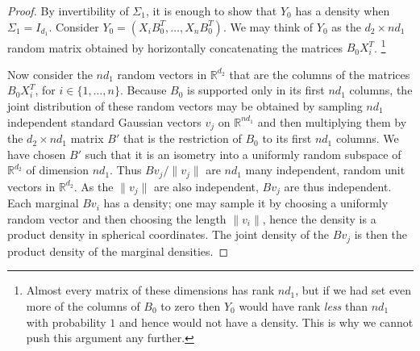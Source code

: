 \documentclass[aos]{imsart}
\theoremstyle{definition}
\numberwithin{equation}{section}
\newcommand{\R}{{\mathbb{R}}}
\begin{document}
\begin{proof}
By invertibility of $\Sigma_1$, it is enough to show that $Y_0$ has a density when $\Sigma_1 = I_{d_1}$.
Consider $Y_0 = (X_i B_0^T, \dots, X_n B_0^T)$.
We may think of $Y_0$ as the $d_2 \times n d_1$ random matrix obtained by horizontally concatenating the matrices $B_0X_i^T$.
\footnote{
Almost every matrix of these dimensions has rank $n d_1$, but if we had set even more of the columns of $B_0$ to zero then $Y_0$ would have rank \emph{less} than $n d_1$ with probability $1$ and hence would not have a density.
This is why we cannot push this argument any further.}

Now consider the $nd_1$ random vectors in $ \R^{d_2}$ that are the columns of the matrices $B_0X_i^T$, for $i \in \{1, \dots, n\}$.
Because $B_0$ is supported only in its first $nd_1$ columns, the joint distribution of these random vectors may be obtained by sampling $n d_1$ independent standard Gaussian vectors $v_j$ on $\R^{nd_1}$ and then multiplying them by the $d_2 \times nd_1$ matrix $B'$ that is the restriction of $B_0$ to its first $nd_1$ columns.
We have chosen $B'$ such that it is an isometry into a uniformly random subspace of $\R^{d_2}$ of dimension $nd_1$.
Thus $Bv_j/\|v_j\|$ are $nd_1$ many independent, random unit vectors in $\R^{d_2}$.
As the $\|v_j\|$ are also independent, $B v_j$ are thus independent. Each marginal $Bv_i$ has a density; one may sample it by choosing a uniformly random vector and then choosing the length $\|v_i\|$, hence the density is a product density in spherical coordinates. The joint density of the $Bv_j$ is then the product density of the marginal densities.
\end{proof}
\end{document}
